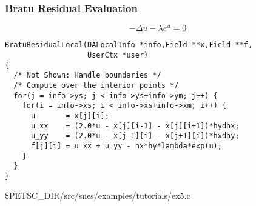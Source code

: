 \begin{frame}[fragile]
\frametitle{Bratu Residual Evaluation}

\begin{equation*}
  -\Delta u - \lambda e^{u} = 0
\end{equation*}

\small
\begin{verbatim}
BratuResidualLocal(DALocalInfo *info,Field **x,Field **f,
                   UserCtx *user)
{
  /* Not Shown: Handle boundaries */
  /* Compute over the interior points */
  for(j = info->ys; j < info->ys+info->ym; j++) {
    for(i = info->xs; i < info->xs+info->xm; i++) {
      u       = x[j][i];
      u_xx    = (2.0*u - x[j][i-1] - x[j][i+1])*hydhx;
      u_yy    = (2.0*u - x[j-1][i] - x[j+1][i])*hxdhy;
      f[j][i] = u_xx + u_yy - hx*hy*lambda*exp(u);
    }
  }
}
\end{verbatim}

\begin{center}\small
\$PETSC\_DIR/src/snes/examples/tutorials/ex5.c
\end{center}
\end{frame}
